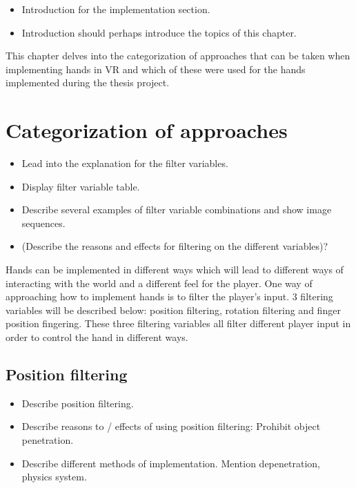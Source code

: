 \begin{itemize}
\item Introduction for the implementation section.
\item Introduction should perhaps introduce the topics of this chapter.
\end{itemize}

This chapter delves into the categorization of approaches that can be taken when implementing hands in VR and which of these were used for the hands implemented during the thesis project.

\section{Categorization of approaches}
\label{sec:categorizationOfApproaches}
\begin{itemize}
\item Lead into the explanation for the filter variables.
\item Display filter variable table.
\item Describe several examples of filter variable combinations and show image sequences.
\item (Describe the reasons and effects for filtering on the different variables)?
\end{itemize}

Hands can be implemented in different ways which will lead to different ways of interacting with the world and a different feel for the player. One way of approaching how to implement hands is to filter the player's input. 3 filtering variables will be described below: position filtering, rotation filtering and finger position fingering. These three filtering variables all filter different player input in order to control the hand in different ways.


\subsection{Position filtering}
\label{subsec:categoryPositionFiltering}
\begin{itemize}
\item Describe position filtering.
\item Describe reasons to / effects of using position filtering: Prohibit object penetration.
\item Describe different methods of implementation. Mention depenetration, physics system.
\end{itemize}

